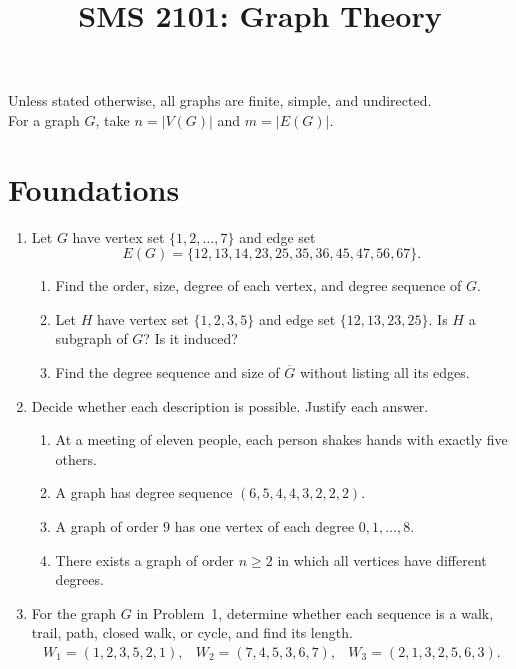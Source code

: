 \documentclass[svgnames]{amsart}
\title{SMS 2101: Graph Theory}
\date{}
\newcommand{\comp}[1]{\overline{#1}}
\begin{document}
\maketitle

\begin{center}
\small
Unless stated otherwise, all graphs are finite, simple, and undirected. \\
For a graph $G$, take $n=|V(G)|$ and $m=|E(G)|$.
\end{center}

\section*{Foundations}

\begin{enumerate}
\item Let $G$ have vertex set $\{1,2,\ldots,7\}$ and edge set
\begin{equation*}
 E(G)=\{12,13,14,23,25,35,36,45,47,56,67\}.
\end{equation*}
\begin{enumerate}
  \item Find the order, size, degree of each vertex, and degree sequence of $G$.
  \item Let $H$ have vertex set $\{1,2,3,5\}$ and edge set $\{12,13,23,25\}$. Is $H$ a subgraph of $G$? Is it induced?
  \item Find the degree sequence and size of $\comp G$ without listing all its edges.
\end{enumerate}

\item Decide whether each description is possible. Justify each answer.
\begin{enumerate}
  \item At a meeting of eleven people, each person shakes hands with exactly five others.
  \item A graph has degree sequence $(6, 5, 4, 4, 3, 2, 2, 2)$.
  \item A graph of order $9$ has one vertex of each degree $0, 1, \ldots, 8$.
  \item There exists a graph of order $n\geq 2$ in which all vertices have different degrees.
\end{enumerate}

\item For the graph $G$ in Problem~1, determine whether each sequence is
a walk, trail, path, closed walk, or cycle, and find its length.
\begin{equation*}
\begin{array}{lll}
W_1=(1,2,3,5,2,1),&
W_2=(7,4,5,3,6,7),&
W_3=(2,1,3,2,5,6,3).
\end{array}
\end{equation*}


\end{enumerate}
\end{document}
